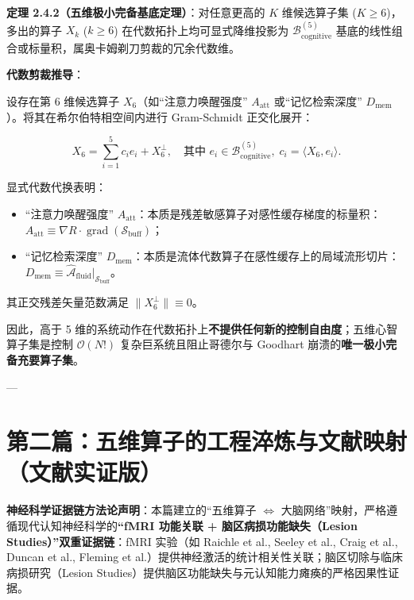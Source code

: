 \documentclass[11pt,a4paper,oneside]{ctexart}
\begin{document}
\textbf{定理 2.4.2（五维极小完备基底定理）}：对任意更高的 $K$ 维候选算子集 ($K \ge 6$)，多出的算子 $X_k$ ($k \ge 6$) 在代数拓扑上均可显式降维投影为 $\mathcal{B}_{\text{cognitive}}^{(5)}$ 基底的线性组合或标量积，属奥卡姆剃刀剪裁的冗余代数维。


\textbf{代数剪裁推导}：

设存在第 6 维候选算子 $X_6$（如“注意力唤醒强度” $A_{\text{att}}$ 或“记忆检索深度” $D_{\text{mem}}$）。将其在希尔伯特相空间内进行 Gram-Schmidt 正交化展开：

\begin{equation}
X_6 = \sum_{i=1}^5 c_i e_i + X_6^\perp, \quad \text{其中 } e_i \in \mathcal{B}_{\text{cognitive}}^{(5)}, \; c_i = \langle X_6, e_i \rangle.
\end{equation}

显式代数代换表明：

\begin{itemize}\item \textit{}“注意力唤醒强度” $A_{\text{att}}$\textit{}：本质是残差敏感算子对感性缓存梯度的标量积：$A_{\text{att}} \equiv \nabla R \cdot \operatorname{grad}(\mathcal{S}_{\text{buff}})$；\end{itemize}
\begin{itemize}\item \textit{}“记忆检索深度” $D_{\text{mem}}$\textit{}：本质是流体代数算子在感性缓存上的局域流形切片：$D_{\text{mem}} \equiv \hat{\mathcal{A}}_{\text{fluid}} \big|_{\mathcal{S}_{\text{buff}}}$。\end{itemize}

其正交残差矢量范数满足 $\|X_6^\perp\| \equiv 0$。


因此，高于 5 维的系统动作在代数拓扑上\textbf{不提供任何新的控制自由度}；五维心智算子集是控制 $\mathcal{O}(N!)$ 复杂巨系统且阻止哥德尔与 Goodhart 崩溃的\textbf{唯一极小完备充要算子集}。


---


\part{第二篇：五维算子的工程淬炼与文献映射（文献实证版）}

\begin{notebox}
\textbf{神经科学证据链方法论声明}：本篇建立的“五维算子 $\Longleftrightarrow$ 大脑网络”映射，严格遵循现代认知神经科学的\textbf{“fMRI 功能关联 + 脑区病损功能缺失（Lesion Studies）”双重证据链}：fMRI 实验（如 Raichle et al., Seeley et al., Craig et al., Duncan et al., Fleming et al.）提供神经激活的统计相关性关联；脑区切除与临床病损研究（Lesion Studies）提供脑区功能缺失与元认知能力瘫痪的严格因果性证据。
\end{notebox}
\end{document}
